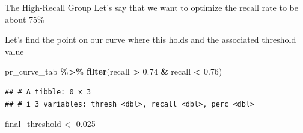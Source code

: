 \documentclass[
  ignorenonframetext,
]{beamer}
\newenvironment{Shaded}{\begin{snugshade}}{\end{snugshade}}
\newcommand{\FloatTok}[1]{\textcolor[rgb]{0.00,0.00,0.81}{#1}}
\newcommand{\FunctionTok}[1]{\textcolor[rgb]{0.13,0.29,0.53}{\textbf{#1}}}
\newcommand{\NormalTok}[1]{#1}
\newcommand{\OtherTok}[1]{\textcolor[rgb]{0.56,0.35,0.01}{#1}}
\newcommand{\SpecialCharTok}[1]{\textcolor[rgb]{0.81,0.36,0.00}{\textbf{#1}}}
\begin{document}
\begin{frame}[fragile]{The High-Recall Group}
\label{the-high-recall-group}
Let's say that we want to optimize the recall rate to be about 75\%

Let's find the point on our curve where this holds and the associated
threshold value

\scriptsize

\begin{Shaded}
\begin{Highlighting}[]
\NormalTok{pr\_curve\_tab }\SpecialCharTok{\%\textgreater{}\%}
  \FunctionTok{filter}\NormalTok{(recall }\SpecialCharTok{\textgreater{}} \FloatTok{0.74} \SpecialCharTok{\&}\NormalTok{ recall }\SpecialCharTok{\textless{}} \FloatTok{0.76}\NormalTok{)}
\end{Highlighting}
\end{Shaded}

\begin{verbatim}
## # A tibble: 0 x 3
## # i 3 variables: thresh <dbl>, recall <dbl>, perc <dbl>
\end{verbatim}

\begin{Shaded}
\begin{Highlighting}[]
\NormalTok{final\_threshold }\OtherTok{\textless{}{-}} \FloatTok{0.025}
\end{Highlighting}
\end{Shaded}
\end{frame}
\end{document}
